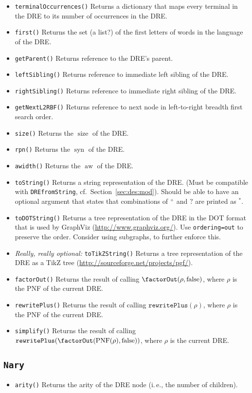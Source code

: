 \documentclass[a4paper,11pt, svgnames,titlepage]{article}
\newcommand{\rxp}{{^\mathtt{+}}}
\newcommand{\rxs}{{^\mathtt{*}}}
\newcommand{\rxo}{\mathtt{?}}
\DeclareMathOperator{\pnf}{PNF}
\DeclareMathOperator{\siz}{size}
\DeclareMathOperator{\syn}{syn}
\DeclareMathOperator{\aw}{aw}
\newcommand{\false}{\ensuremath{\operatorname{false}}\xspace}
\begin{document}
\begin{itemize}
	\item\texttt{terminalOccurrences()} Returns a dictionary that maps every terminal in the DRE to its number of occurrences in the DRE.
	\item\texttt{first()} Returns the set (a list?) of the first letters of words in the language of the DRE.
	\item\texttt{getParent()} Returns reference to the DRE's parent.
	\item\texttt{leftSibling()} Returns reference to immediate left sibling of the DRE.
	\item\texttt{rightSibling()} Returns reference to immediate right sibling of the DRE.
	\item\texttt{getNextL2RBF()} Returns reference to next node in left-to-right breadth first search order.
	\item\texttt{size()} Returns the $\siz$ of the DRE.
	\item\texttt{rpn()} Returns the $\syn$ of the DRE.
	\item\texttt{awidth()} Returns the $\aw$ of the DRE.
	\item\texttt{toString()} Returns a string representation of the DRE. (Must be compatible with \texttt{DREfromString}, cf.\ Section~\ref{sec:des:mod}). Should be able to have an optional argument that states that combinations of $\rxp$ and $\rxo$ are printed as $\rxs$.
	\item\texttt{toDOTString()} Returns a tree representation of the DRE in the DOT format that is used by GraphViz (\url{http://www.graphviz.org/}). Use \texttt{ordering=out} to preserve the order. Consider using subgraphs, to further enforce this.
	\item \emph{Really, really optional:} \texttt{toTikZString()} Returns a tree representation of the DRE as a TikZ tree (\url{http://sourceforge.net/projects/pgf/}).
	\item \texttt{factorOut()} Returns the result of calling $\factorOut(\rho,\false)$, where $\rho$ is the PNF of the current DRE.
	\item \texttt{rewritePlus()} Returns the result of calling $\mathtt{rewritePlus}(\rho)$, where $\rho$ is the PNF of the current DRE.
	\item \texttt{simplify()} Returns the result of calling $\mathtt{rewritePlus}(\factorOut(\pnf(\rho),\false))$, where $\rho$ is the current DRE.
\end{itemize}
\subsection{\texttt{Nary}}\label{sec:des:nary}
\begin{itemize}
	\item\texttt{arity()} Returns the arity of the DRE node (i.\,e., the number of children).
\end{itemize}
\end{document}
